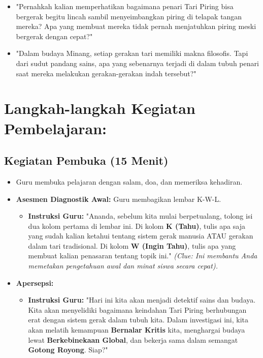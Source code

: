 \documentclass[a4paper,12pt]{article}
\begin{document}
\begin{itemize}
\item "Pernahkah kalian memperhatikan bagaimana penari Tari Piring bisa bergerak begitu lincah sambil menyeimbangkan piring di telapak tangan mereka? Apa yang membuat mereka tidak pernah menjatuhkan piring meski bergerak dengan cepat?"
\item "Dalam budaya Minang, setiap gerakan tari memiliki makna filosofis. Tapi dari sudut pandang sains, apa yang sebenarnya terjadi di dalam tubuh penari saat mereka melakukan gerakan-gerakan indah tersebut?"
\end{itemize}

\section{Langkah-langkah Kegiatan Pembelajaran:}

\subsection{Kegiatan Pembuka (15 Menit)}
\begin{itemize}
\item Guru membuka pelajaran dengan salam, doa, dan memeriksa kehadiran.
\item \textbf{Asesmen Diagnostik Awal:} Guru membagikan lembar K-W-L.
    \begin{itemize}
    \item \textbf{Instruksi Guru:} "Ananda, sebelum kita mulai berpetualang, tolong isi dua kolom pertama di lembar ini. Di kolom \textbf{K (Tahu)}, tulis apa saja yang sudah kalian ketahui tentang sistem gerak manusia ATAU gerakan dalam tari tradisional. Di kolom \textbf{W (Ingin Tahu)}, tulis apa yang membuat kalian penasaran tentang topik ini." \textit{(Clue: Ini membantu Anda memetakan pengetahuan awal dan minat siswa secara cepat).}
    \end{itemize}
\item \textbf{Apersepsi:}
    \begin{itemize}
    \item \textbf{Instruksi Guru:} "Hari ini kita akan menjadi detektif sains dan budaya. Kita akan menyelidiki bagaimana keindahan Tari Piring berhubungan erat dengan sistem gerak dalam tubuh kita. Dalam investigasi ini, kita akan melatih kemampuan \textbf{Bernalar Kritis} kita, menghargai budaya lewat \textbf{Berkebinekaan Global}, dan bekerja sama dalam semangat \textbf{Gotong Royong}. Siap?"
    \end{itemize}
\end{itemize}
\end{document}
